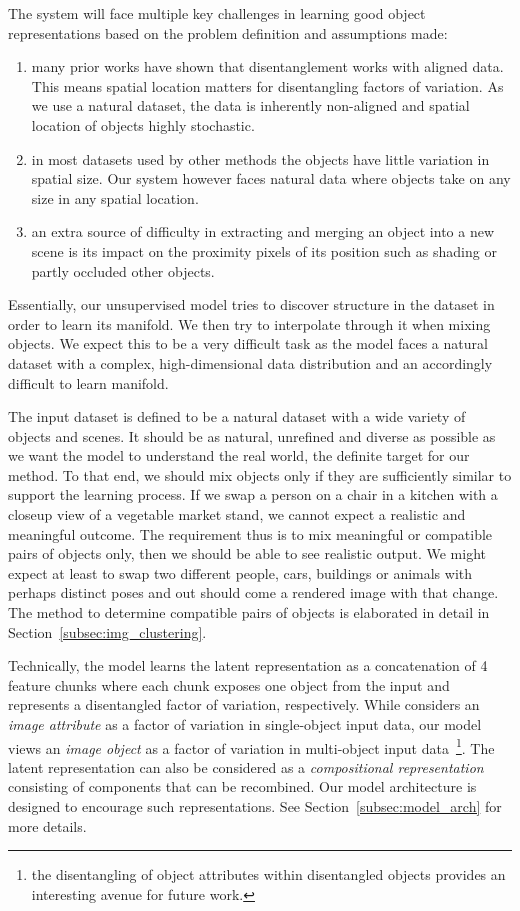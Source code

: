 \documentclass[12pt,a4paper]{article}
\begin{document}
The system will face multiple key challenges in learning good object representations based on the problem definition and assumptions made:
\begin{enumerate}
  \item many prior works have shown that disentanglement works with aligned data. This means spatial location matters for disentangling factors of variation. As we use a natural dataset, the data is inherently non-aligned and spatial location of objects highly stochastic.
  \item  in most datasets used by other methods the objects have little variation in spatial size. Our system however faces natural data where objects take on any size in any spatial location.
  \item an extra source of difficulty in extracting and merging an object into a new scene is its impact on the proximity pixels of its position such as shading or partly occluded other objects.
\end{enumerate}
Essentially, our unsupervised model tries to discover structure in the dataset in order to learn its manifold. We then try to interpolate through it when mixing objects. We expect this to be a very difficult task as the model faces a natural dataset with a complex, high-dimensional data distribution and an accordingly difficult to learn manifold. 

The input dataset is defined to be a natural dataset with a wide variety of objects and scenes. It should be as natural, unrefined and diverse as possible as we want the model to understand the real world, the definite target for our method. To that end, we should mix objects only if they are sufficiently similar to support the learning process. If we swap a person on a chair in a kitchen with a closeup view of a vegetable market stand, we cannot expect a realistic and meaningful outcome. The requirement thus is to mix meaningful or compatible pairs of objects only, then we should be able to see realistic output. We might expect at least to swap two different people, cars, buildings or animals with perhaps distinct poses and out should come a rendered image with that change. The method to determine compatible pairs of objects is elaborated in detail in Section~\ref{subsec:img_clustering}. 

Technically, the model learns the latent representation as a concatenation of 4 feature chunks where each chunk exposes one object from the input and represents a disentangled factor of variation, respectively. While \cite{DisentFacOfVarByMixTh} considers an \textit{image attribute} as a factor of variation in single-object input data, our model views an \textit{image object} as a factor of variation in multi-object input data~\footnote{the disentangling of object attributes within disentangled objects provides an interesting avenue for future work.}. The latent representation can also be considered as a \textit{compositional representation}~\cite{SpatialBDecoder} consisting of components that can be recombined. %
Our model architecture is designed to encourage such representations. See Section~\ref{subsec:model_arch} for more details. 
\end{document}

